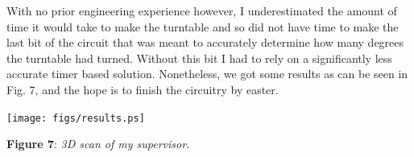 \documentclass[noback]{cuposter}
\begin{document}
With no prior engineering experience however, I underestimated the amount of time it would take to make the turntable and so did not have time to make the last bit of the circuit that was meant to accurately determine how many degrees the turntable had turned.
Without this bit I had to rely on a significantly less accurate timer based solution.
Nonetheless, we got some results as can be seen in Fig. 7, and the hope is to finish the circuitry by easter.

\vspace*{2cm}
{
\centerline{\texttt{[image: figs/results.ps]}}
}
\vspace*{5mm} \textbf{Figure 7}: \textit{3D scan of my supervisor.}
\end{document}
